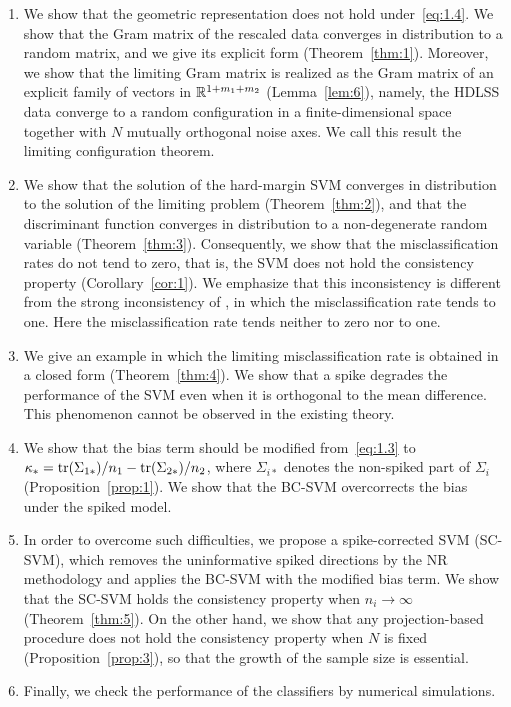 \begin{enumerate}[label=(\roman*)]
\item We show that the geometric representation does not hold under~\eqref{eq:1.4}.
We show that the Gram matrix of the rescaled data converges in distribution to a
random matrix, and we give its explicit form (Theorem~\ref{thm:1}). Moreover, we
show that the limiting Gram matrix is realized as the Gram matrix of an explicit
family of vectors in $\mathbb{R}^{1+m_1+m_2}$ (Lemma~\ref{lem:6}), namely, the HDLSS data
converge to a random configuration in a finite-dimensional space together with $N$
mutually orthogonal noise axes. We call this result the limiting configuration
theorem.

\item We show that the solution of the hard-margin SVM converges in distribution to
the solution of the limiting problem (Theorem~\ref{thm:2}), and that the discriminant
function converges in distribution to a non-degenerate random variable
(Theorem~\ref{thm:3}). Consequently, we show that the misclassification rates do not
tend to zero, that is, the SVM does not hold the consistency property
(Corollary~\ref{cor:1}). We emphasize that this inconsistency is different from the
strong inconsistency of \citet{nakayama2017}, in which the misclassification rate
tends to one. Here the misclassification rate tends neither to zero nor to one.

\item We give an example in which the limiting misclassification rate is obtained in
a closed form (Theorem~\ref{thm:4}). We show that a spike degrades the performance of
the SVM even when it is orthogonal to the mean difference. This phenomenon cannot
be observed in the existing theory.

\item We show that the bias term should be modified from~\eqref{eq:1.3} to
$\kappa_*=\operatorname{tr}(\Sigma_{1*})/n_1-\operatorname{tr}(\Sigma_{2*})/n_2$, where $\Sigma_{i*}$ denotes
the non-spiked part of $\Sigma_i$ (Proposition~\ref{prop:1}). We show that the
BC-SVM overcorrects the bias under the spiked model.

\item In order to overcome such difficulties, we propose a spike-corrected SVM
(SC-SVM), which removes the uninformative spiked directions by the NR methodology
and applies the BC-SVM with the modified bias term. We show that the SC-SVM holds
the consistency property when $n_i\to\infty$ (Theorem~\ref{thm:5}). On the other
hand, we show that any projection-based procedure does not hold the consistency
property when $N$ is fixed (Proposition~\ref{prop:3}), so that the growth of the
sample size is essential.

\item Finally, we check the performance of the classifiers by numerical simulations.
\end{enumerate}

